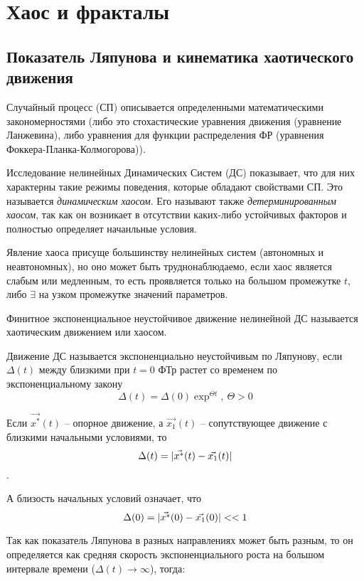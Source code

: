 \chapter{Хаос и фракталы}

\section{Показатель Ляпунова и кинематика хаотического движения}

Случайный процесс (СП) описывается определенными математическими закономерностями (либо это стохастические уравнения движения (уравнение Ланжевина), либо уравнения для функции распределения ФР (уравнения Фоккера-Планка-Колмогорова)).

Исследование нелинейных Динамических Систем (ДС) показывает, что  для них характерны такие режимы поведения, которые обладают свойствами СП. Это называется \textit{динамическим хаосом}. Его называют также \textit{детерминированным хаосом}, так как он возникает в отсутствии каких-либо устойчивых факторов и полностью определяет начанльные условия.

Явление хаоса присуще большинству нелинейных систем (автономных и неавтономных), но оно может быть труднонаблюдаемо, если хаос является слабым или медленным, то есть проявляется только на большом промежутке $t$, либо $\exists$ на узком промежутке значений параметров.

\begin{definition}
  Финитное экспоненциальное неустойчивое движение нелинейной ДС называется хаотическим движением или хаосом.
\end{definition}

\begin{definition}
  Движение ДС называется экспоненциально неустойчивым по Ляпунову, если $\Delta(t)$ между близкими при $t=0$ ФТр растет со временем по экспоненциальному закону
  $$\Delta(t) = \Delta(0) \exp^{\Theta t}, \ \Theta > 0$$
\end{definition}

Если $\vec{x^{*}}(t)$ -- опорное движение, а $\vec{x_{1}}(t)$ -- сопутствующее движение с близкими начальными условиями, то $$\Delta(t) = \lvert\vec{x^{*}}(t) - \vec{x_{1}}(t)\rvert$$.

А близость начальных условий означает, что $$\Delta(0) = \lvert\vec{x^{*}}(0) - \vec{x_{1}}(0)\rvert << 1$$

Так как показатель Ляпунова в разных направлениях может быть разным, то он определяется как средняя скорость экспоненциального роста на большом интервале времени ($\Delta(t) \rightarrow \infty$), тогда:

